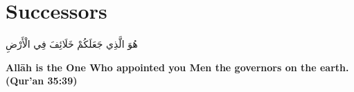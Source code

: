 \chapter{Successors}
\begin{center}
    {\Huge    
        \begin{Arabic}
            هُوَ الَّذِي جَعَلَكُمْ خَلَائِفَ فِي الْأَرْضِ
        \end{Arabic}
    }
\end{center}
\vspace*{\fill}
\vspace{3cm}
\begin{center}
    \large \textbf{Allāh is the One Who appointed you Men the governors on the earth. (Qur'an 35:39)}
\end{center}
